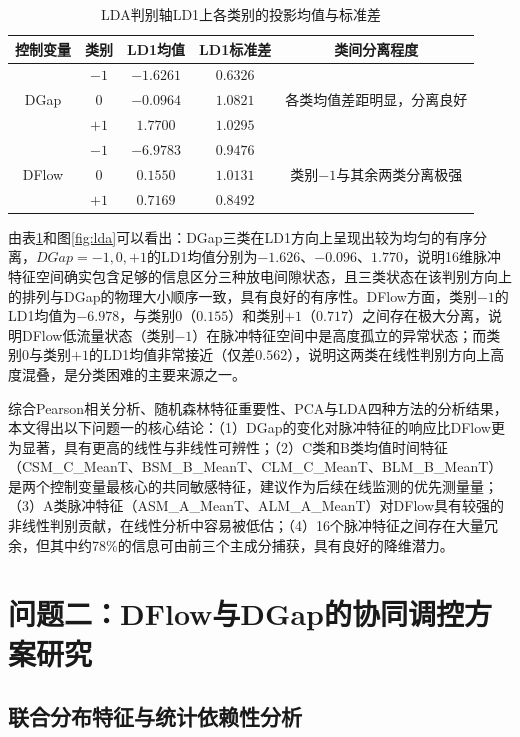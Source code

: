\documentclass[UTF8,a4paper,12pt]{ctexart}
\begin{document}
\begin{table}[H]
\centering
\caption{LDA判别轴LD1上各类别的投影均值与标准差}
\label{tab:lda}
\begin{tabular}{ccccc}
\toprule
控制变量 & 类别 & LD1均值 & LD1标准差 & 类间分离程度 \\
\midrule
\multirow{3}{*}{DGap} & $-1$ & $-1.6261$ & $0.6326$ & \multirow{3}{*}{各类均值差距明显，分离良好} \\
 & $0$ & $-0.0964$ & $1.0821$ & \\
 & $+1$ & $1.7700$ & $1.0295$ & \\
\midrule
\multirow{3}{*}{DFlow} & $-1$ & $-6.9783$ & $0.9476$ & \multirow{3}{*}{类别$-1$与其余两类分离极强} \\
 & $0$ & $0.1550$ & $1.0131$ & \\
 & $+1$ & $0.7169$ & $0.8492$ & \\
\bottomrule
\end{tabular}
\end{table}

由表\ref{tab:lda}和图\ref{fig:lda}可以看出：DGap三类在LD1方向上呈现出较为均匀的有序分离，$DGap=-1,0,+1$的LD1均值分别为$-1.626$、$-0.096$、$1.770$，说明16维脉冲特征空间确实包含足够的信息区分三种放电间隙状态，且三类状态在该判别方向上的排列与DGap的物理大小顺序一致，具有良好的有序性。DFlow方面，类别$-1$的LD1均值为$-6.978$，与类别$0$（$0.155$）和类别$+1$（$0.717$）之间存在极大分离，说明DFlow低流量状态（类别$-1$）在脉冲特征空间中是高度孤立的异常状态；而类别$0$与类别$+1$的LD1均值非常接近（仅差$0.562$），说明这两类在线性判别方向上高度混叠，是分类困难的主要来源之一。

综合Pearson相关分析、随机森林特征重要性、PCA与LDA四种方法的分析结果，本文得出以下问题一的核心结论：（1）DGap的变化对脉冲特征的响应比DFlow更为显著，具有更高的线性与非线性可辨性；（2）C类和B类均值时间特征（CSM\_C\_MeanT、BSM\_B\_MeanT、CLM\_C\_MeanT、BLM\_B\_MeanT）是两个控制变量最核心的共同敏感特征，建议作为后续在线监测的优先测量量；（3）A类脉冲特征（ASM\_A\_MeanT、ALM\_A\_MeanT）对DFlow具有较强的非线性判别贡献，在线性分析中容易被低估；（4）16个脉冲特征之间存在大量冗余，但其中约78\%的信息可由前三个主成分捕获，具有良好的降维潜力。

\section{问题二：DFlow与DGap的协同调控方案研究}

\subsection{联合分布特征与统计依赖性分析}
\end{document}
